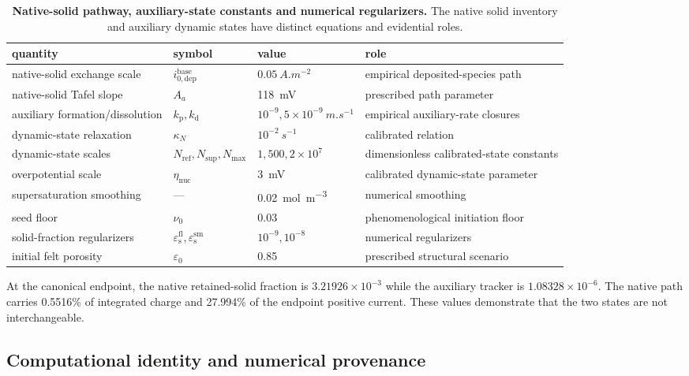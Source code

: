 \documentclass[11pt]{article}
\let\SIorigsubsection\subsection
\renewcommand{\subsection}{\FloatBarrier\SIorigsubsection}
\newcommand{\epss}{\varepsilon_{\mathrm{s}}}
\begin{document}
\begin{table}[!htbp]
\centering\footnotesize
\caption{\textbf{Native-solid pathway, auxiliary-state constants and numerical regularizers.} The native solid
inventory and auxiliary dynamic states have distinct equations and evidential roles.}
\label{tab:solid-inputs}
\begin{tabularx}{\textwidth}{@{}P{3.4cm}P{2.35cm}P{2.6cm}Y@{}}
\toprule
quantity & symbol & value & role\\
\midrule
native-solid exchange scale & $i_{0,\mathrm{dep}}^{\mathrm{base}}$ & $0.05~\si{A.m^{-2}}$ & empirical deposited-species path\\
native-solid Tafel slope & $A_a$ & \SI{118}{mV} & prescribed path parameter\\
auxiliary formation/dissolution & $k_{\mathrm p},k_{\mathrm d}$ & $10^{-9},5\times10^{-9}~\si{m.s^{-1}}$ & empirical auxiliary-rate closures\\
dynamic-state relaxation & $\kappa_N$ & $10^{-2}~\si{s^{-1}}$ & calibrated relation\\
dynamic-state scales & $N_{\mathrm{ref}},N_{\mathrm{sup}},N_{\max}$ & $1,500,2\times10^7$ & dimensionless calibrated-state constants\\
overpotential scale & $\eta_{\mathrm{nuc}}$ & \SI{3}{mV} & calibrated dynamic-state parameter\\
supersaturation smoothing & --- & \SI{0.02}{mol.m^{-3}} & numerical smoothing\\
seed floor & $\nu_0$ & 0.03 & phenomenological initiation floor\\
solid-fraction regularizers & $\epss^{\mathrm{fl}},\epss^{\mathrm{sm}}$ & $10^{-9},10^{-8}$ & numerical regularizers\\
initial felt porosity & $\varepsilon_0$ & 0.85 & prescribed structural scenario\\
\bottomrule
\end{tabularx}
\end{table}

At the canonical endpoint, the native retained-solid fraction is $3.21926\times10^{-3}$ while the auxiliary
tracker is $1.08328\times10^{-6}$. The native path carries 0.5516\% of integrated charge and 27.994\% of the
endpoint positive current. These values demonstrate that the two states are not interchangeable.

\subsection{Computational identity and numerical provenance}
\end{document}
